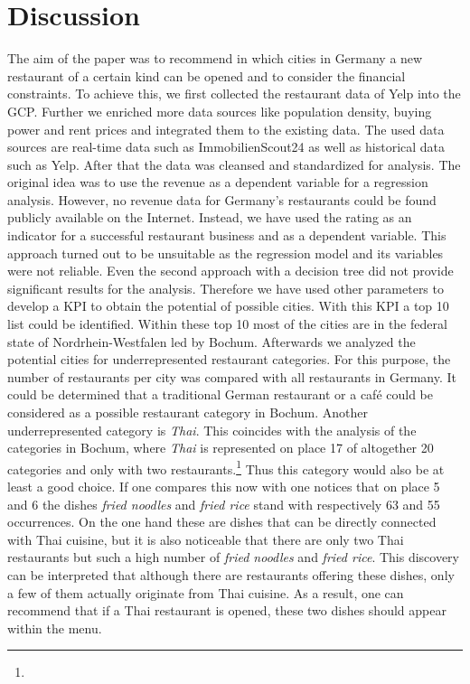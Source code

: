 \section{Discussion}
\label{sec:discussion}
The aim of the paper was to recommend in which cities in Germany a new restaurant of a certain kind can be opened and to consider the financial constraints. To achieve this, we first collected the restaurant data of Yelp into the \ac{GCP}. Further we enriched more data sources like population density, buying power and rent prices and integrated them to the existing data. The used data sources are real-time data such as ImmobilienScout24 as well as historical data such as Yelp. After that the data was cleansed and standardized for analysis. The original idea was to use the revenue as a dependent variable for a regression analysis. However, no revenue data for Germany's restaurants could be found publicly available on the Internet. Instead, we have used the rating as an indicator for a successful restaurant business and as a dependent variable. This approach turned out to be unsuitable as the regression model and its variables were not reliable. Even the second approach with a decision tree did not provide significant results for the analysis. Therefore we have used other parameters to develop a \ac{KPI} to obtain the potential of possible cities. With this \ac{KPI} a top 10 list could be identified. Within these top 10 most of the cities are in the federal state of Nordrhein-Westfalen led by Bochum. Afterwards we analyzed the potential cities for underrepresented restaurant categories. For this purpose, the number of restaurants per city was compared with all restaurants in Germany. 
It could be determined that a traditional German restaurant or a café could be considered as a possible restaurant category in Bochum. Another underrepresented category is \textit{Thai}. This coincides with the analysis of the categories in Bochum, where \textit{Thai} is represented on place 17 of altogether 20 categories and only with two restaurants.\footnote{} Thus this category would also be at least a good choice. If one compares this now with  one notices that on place 5 and 6 the dishes \textit{fried noodles} and \textit{fried rice} stand with respectively 63 and 55 occurrences. On the one hand these are dishes that can be directly connected with Thai cuisine, but it is also noticeable that there are only two Thai restaurants but such a high number of \textit{fried noodles} and \textit{fried rice}.
This discovery can be interpreted that although there are restaurants offering these dishes, only a few of them actually originate from Thai cuisine. As a result, one can recommend that if a Thai restaurant is opened, these two dishes should appear within the menu.
